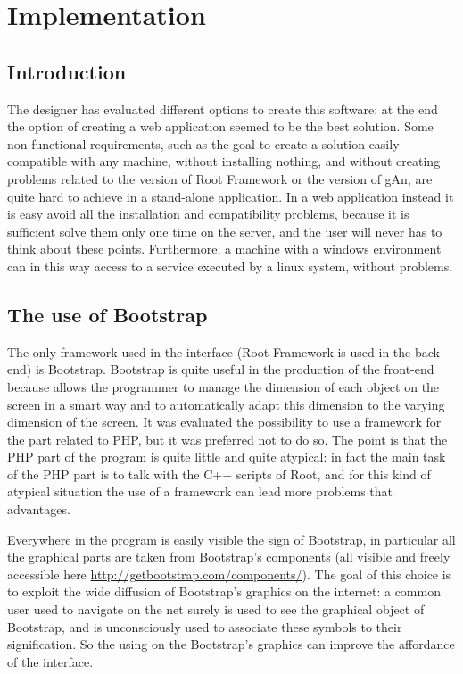 
\chapter{Implementation} %

\label{Chapter8} %


\section{Introduction}

The designer has evaluated different options to create this software: at the end the option of creating a web application seemed to be the best solution.
Some non-functional requirements, such as the goal to create a solution easily compatible with any machine, without installing nothing, and without creating problems related to the version of Root Framework or the version of gAn, are quite hard to achieve in a stand-alone application. In a web application instead it is easy avoid all the installation and compatibility problems, because it is sufficient solve them only one time on the server, and the user will never has to think about these points. Furthermore, a machine with a windows environment can in this way access to a service executed by a linux system, without problems.  

\section{The use of Bootstrap}

The only framework used in the interface (Root Framework is used in the back-end) is Bootstrap. Bootstrap is quite useful in the production of the front-end because allows the programmer to manage the dimension of each object on the screen in a smart way and to automatically adapt this dimension to the varying dimension of the screen. It was evaluated the possibility to use a framework for the part related to PHP, but it was preferred not to do so. The point is that the PHP part of the program is quite little and quite atypical: in fact the main task of the PHP part is to talk with the C++ scripts of Root, and for this kind of atypical situation the use of a framework can lead more problems that advantages.  

Everywhere in the program is easily visible the sign of Bootstrap, in particular all the graphical parts are taken from Bootstrap's components (all visible and freely accessible here \url{http://getbootstrap.com/components/}). The goal of this choice is to exploit the wide diffusion of Bootstrap's graphics on the internet: a common user used to navigate on the net surely is used to see the graphical object of Bootstrap, and is unconsciously used to associate these symbols to their signification. So the using on the Bootstrap's graphics can improve the affordance of the interface. 

